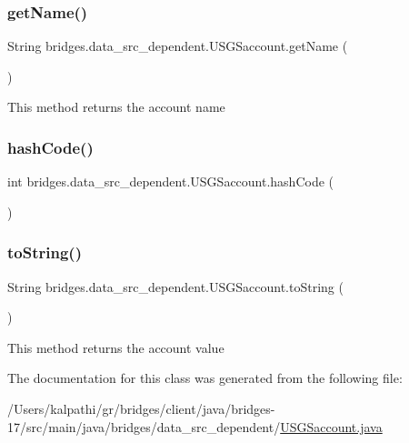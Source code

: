 \subsubsection{\texorpdfstring{get\+Name()}{getName()}}
{\footnotesize\ttfamily String bridges.\+data\+\_\+src\+\_\+dependent.\+U\+S\+G\+Saccount.\+get\+Name (\begin{DoxyParamCaption}{ }\end{DoxyParamCaption})}

This method returns the account name \mbox{\label{classbridges_1_1data__src__dependent_1_1_u_s_g_saccount_afe2cc53d7993aaf4424f42fb535c7ed1}} 
\subsubsection{\texorpdfstring{hash\+Code()}{hashCode()}}
{\footnotesize\ttfamily int bridges.\+data\+\_\+src\+\_\+dependent.\+U\+S\+G\+Saccount.\+hash\+Code (\begin{DoxyParamCaption}{ }\end{DoxyParamCaption})}

\mbox{\label{classbridges_1_1data__src__dependent_1_1_u_s_g_saccount_a832c5a4953a40fd3fa89243fcdabc435}} 
\subsubsection{\texorpdfstring{to\+String()}{toString()}}
{\footnotesize\ttfamily String bridges.\+data\+\_\+src\+\_\+dependent.\+U\+S\+G\+Saccount.\+to\+String (\begin{DoxyParamCaption}{ }\end{DoxyParamCaption})}

This method returns the account value 

The documentation for this class was generated from the following file\+:\begin{DoxyCompactItemize}
\item 
/\+Users/kalpathi/gr/bridges/client/java/bridges-\/17/src/main/java/bridges/data\+\_\+src\+\_\+dependent/\mbox{\hyperlink{_u_s_g_saccount_8java}{U\+S\+G\+Saccount.\+java}}\end{DoxyCompactItemize}
